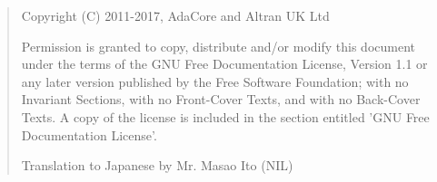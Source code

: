 \bigskip
\begin{quote}
   Copyright (C) 2011-2017, AdaCore and Altran UK Ltd

   Permission is granted to copy, distribute and/or modify this document
   under the terms of the GNU Free Documentation License, Version 1.1
   or any later version published by the Free Software Foundation;
   with no Invariant Sections, with no Front-Cover Texts, and with no
   Back-Cover Texts.
   A copy of the license is included in the section entitled 'GNU
   Free Documentation License'.

   Translation to Japanese by Mr. Masao Ito (NIL)
\end{quote}
\bigskip
